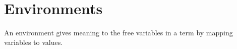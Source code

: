 \begin{fence}
\begin{code}
\>[0][@{}l@{\AgdaIndent{0}}]%
\>[2]%
\>[346I]\AgdaSpace{}%
\AgdaSpace{}%
\AgdaSpace{}%
\AgdaSpace{}%
\<%
\\
\>[.][@{}l@{}]\<[346I]%
\>[4]\AgdaComment{---------}\<%
\\
%
\>[2]\AgdaSpace{}%
\AgdaSpace{}%
\AgdaSpace{}%
\<%
\\
\>[0]\AgdaSpace{}%
\AgdaSymbol{(}\AgdaSpace{}%
\AgdaSpace{}%
\AgdaSymbol{)}\AgdaSpace{}%
\AgdaSymbol{=}\AgdaSpace{}%
\<%
\\
\>[0]\AgdaSpace{}%
\AgdaSymbol{(}\AgdaSpace{}%
\AgdaSymbol{)}\AgdaSpace{}%
\AgdaSymbol{=}\AgdaSpace{}%
\AgdaSpace{}%
\AgdaSymbol{(}\AgdaSpace{}%
\AgdaSymbol{)}\<%
\\
\>[0]\AgdaSpace{}%
\AgdaSymbol{(}\AgdaSpace{}%
\AgdaSymbol{)}\AgdaSpace{}%
\AgdaSymbol{=}\AgdaSpace{}%
\AgdaSpace{}%
\AgdaSymbol{(}\AgdaSpace{}%
\AgdaSymbol{)}\<%
\\
\>[0]\AgdaSpace{}%
\AgdaSymbol{(}\AgdaSpace{}%
\AgdaSpace{}%
\AgdaSymbol{)}\AgdaSpace{}%
\AgdaSymbol{=}\AgdaSpace{}%
\AgdaSpace{}%
\AgdaSymbol{(}\AgdaSpace{}%
\AgdaSymbol{)}\AgdaSpace{}%
\<%
\end{code}
\end{fence}

\hypertarget{environments}{%
\section{Environments}\label{environments}}

An environment gives meaning to the free variables in a term by mapping
variables to values.

\begin{fence}
\begin{code}%
\>[0]\AgdaSpace{}%
\AgdaSymbol{:}\AgdaSpace{}%
\AgdaSpace{}%
\AgdaSpace{}%
\<%
\\
\>[0]\AgdaSpace{}%
\AgdaSpace{}%
\AgdaSymbol{=}\AgdaSpace{}%
\AgdaSpace{}%
\AgdaSymbol{(}\AgdaSpace{}%
\AgdaSymbol{:}\AgdaSpace{}%
\AgdaSpace{}%
\AgdaSpace{}%
\AgdaSymbol{)}\AgdaSpace{}%
\AgdaSpace{}%
\<%
\end{code}
\end{fence}

